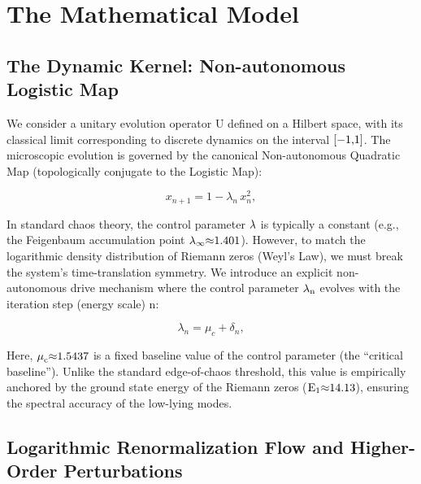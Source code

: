 \documentclass[fractalfract,article,submit,oneauthor,pdftex]{Definitions/mdpi}
\begin{document}
\section{The Mathematical Model}\label{sec:model}

\subsection{The Dynamic Kernel: Non-autonomous Logistic Map}

We consider a unitary evolution operator \(\text{U}\) defined on a
Hilbert space, with its classical limit corresponding to discrete
dynamics on the interval \(\text{[\ensuremath{-}1,1]}\). The microscopic evolution is
governed by the canonical Non-autonomous Quadratic Map (topologically
conjugate to the Logistic Map):

\begin{equation}\label{eq:map}
x_{n+1} = 1 - \lambda_n\, x_n^{2},
\end{equation}

In standard chaos theory, the control parameter \(\text{\ensuremath{\lambda}}\) is
typically a constant (e.g., the Feigenbaum accumulation point
\(\text{\ensuremath{\lambda}}_{\text{\ensuremath{\infty}}}\text{\ensuremath{\approx}1.401}\)). However, to match the logarithmic
density distribution of Riemann zeros (Weyl's Law), we must break the
system's time-translation symmetry. We introduce an explicit
non-autonomous drive mechanism where the control parameter
\(\text{\ensuremath{\lambda}}_{\text{n}}\) evolves with the iteration step (energy scale)
\(\text{n}\):

\begin{equation}\label{eq:split}
\lambda_n = \mu_c + \delta_n,
\end{equation}

Here, \(\text{\ensuremath{\mu}}_{\text{c}}\text{\ensuremath{\approx}1.5437}\) is a fixed baseline value of the control parameter (the ``critical baseline''). Unlike the standard edge-of-chaos
threshold, this value is empirically anchored by the ground state energy
of the Riemann zeros (\(\text{E}_{\text{1}}\text{\ensuremath{\approx}14.13}\)), ensuring
the spectral accuracy of the low-lying modes.

\subsection{Logarithmic Renormalization Flow and Higher-Order Perturbations}
\end{document}
